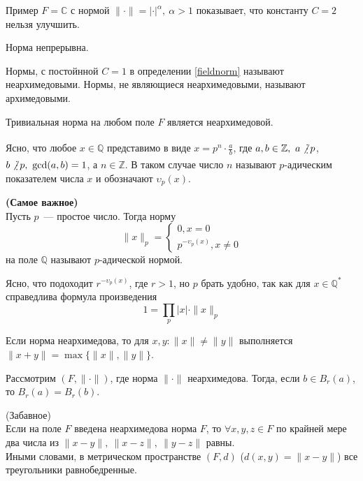 \documentclass[11pt]{report}
\begin{document}
    \begin{remark}
        Пример $F = \mathbb{C}$ с нормой $\| \cdot \| = | \cdot |^{\alpha}, \ \alpha > 1$ показывает, что константу $C = 2$ нельзя улучшить.
    \end{remark}
    \begin{corollary}
        Норма непрерывна.
    \end{corollary}
    \begin{definition}
        Нормы, с постойнной $C = 1$ в определении \ref{fieldnorm} называют неархимедовыми. Нормы, не являющиеся неархимедовыми,
        называют архимедовыми.
    \end{definition}
    \begin{example}
        Тривиальная норма на любом поле $F$ является неархимедовой.
    \end{example}
    \begin{definition}
        Ясно, что любое $x \in \mathbb{Q}$ представимо в виде $x = p^n \cdot \frac{a}{b}$, где $a, b \in \mathbb{Z}, \ a \not\divisible p$, $b \not\divisible p, \ \gcd(a, b) = 1$, а $n \in \mathbb{Z}$.
        В таком случае число $n$ называют $p$-адическим показателем числа $x$ и обозначают $\upsilon_p(x)$.
    \end{definition}
    \begin{definition} \textbf{(Самое важное)}\\
    Пусть $p$~--- простое число. Тогда норму
        \[ \| x \|_{p} = \begin{cases} 0, x = 0 \\ p^{-\upsilon_p(x)}, x \neq 0  \end{cases}\]
    на поле $\mathbb{Q}$ называют $p$-адической нормой.
    \end{definition}

    \begin{remark}
        Ясно, что подоходит $r^{-\upsilon_p(x)}$, где $r > 1$, но $p$ брать удобно, так как для $x \in \mathbb{Q}^{*}$ справедлива формула произведения
        \[ 1 = \prod\limits_{p} |x| \cdot  \| x \|_{p} \]
    \end{remark}
    \begin{lemma}
        Если норма неархимедова, то для $x, y\colon \| x \| \neq \| y \|$ выполняется $\| x + y \| = \max\{\| x \|, \| y \| \}$.
    \end{lemma}
    \begin{corollary}
        Рассмотрим $(F, \| \cdot \| )$, где норма $\| \cdot \|$ неархимедова. Тогда, если  $b \in B_r(a)$, то $B_r(a) = B_r(b)$.
     \end{corollary}
    \begin{corollary} (Забавное)\\
        Если на поле $F$ введена неархимедова норма $F$, то $\forall x, y, z \in F$ по крайней мере два числа из
        $\| x - y \|, \ \| x - z \|, \ \| y - z\| $ равны. \\
        Иными словами, в метрическом пространстве $(F, d)$ ($d(x, y) = \| x - y \| $) все треугольники равнобедренные.
    \end{corollary}
\end{document}
